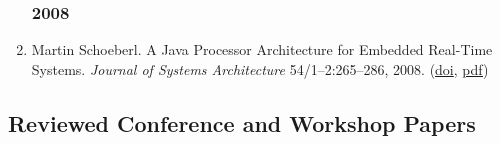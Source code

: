 \begin{enumerate}
\subsubsection*{2008}

\item Martin Schoeberl.
 A Java Processor Architecture for Embedded Real-Time Systems.
 \emph{Journal of Systems Architecture} 54/1--2:265--286, 2008.
(\href{http://dx.doi.org/http://dx.doi.org/10.1016/j.sysarc.2007.06.001}{doi}, \href{http://www.jopdesign.com/doc/rtarch.pdf}{pdf})


\end{enumerate}

\subsection*{Reviewed Conference and Workshop Papers}

